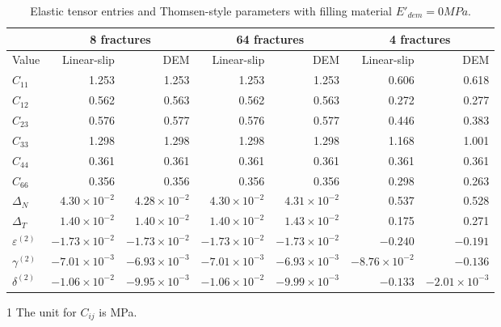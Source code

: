 \documentclass[review,authoryear]{elsarticle}
\begin{document}
\begin{table}
\centering
\begin{threeparttable}
\caption{Elastic tensor entries and Thomsen-style parameters with filling material $E'_{dem} = 0 MPa$.}
\begin{tabular}{lrr|rr|rr}
 \hline
& \multicolumn{2}{c|}{8 fractures}& \multicolumn{2}{c|}{64 fractures} & \multicolumn{2}{c}{4 fractures}\\
\hline
Value\tnote{1} & Linear-slip & DEM & Linear-slip & DEM & Linear-slip & DEM\\
\hline
$C_{11}$ 		& 1.253 & 1.253 & 1.253 & 1.253 & 0.606 & 0.618 \\
$C_{12}$ 		& 0.562 & 0.563 & 0.562 & 0.563 & 0.272 & 0.277 \\
$C_{23}$ 		& 0.576 & 0.577 & 0.576 & 0.577 & 0.446 & 0.383 \\
$C_{33}$ 		& 1.298 & 1.298 & 1.298 & 1.298 & 1.168 & 1.001 \\
$C_{44}$ 		& 0.361 & 0.361 & 0.361 & 0.361 & 0.361 & 0.361 \\
$C_{66}$ 		& 0.356 & 0.356 & 0.356 & 0.356 & 0.298 & 0.263 \\
$\Delta_N$  	& $4.30{\times}10^{-2}$ & $4.28{\times}10^{-2}$ & $4.30{\times}10^{-2}$ & $4.31{\times}10^{-2}$ & 0.537 & 0.528 \\
$\Delta_T$	& $1.40{\times}10^{-2}$ & $1.40{\times}10^{-2}$ & $ 1.40{\times}10^{-2}$ & $1.43{\times}10^{-2}$ & 0.175 & 0.271 \\
$\varepsilon^{(2)}$ & $-1.73{\times}10^{-2}$ & $-1.73{\times}10^{-2}$ & $-1.73{\times}10^{-2}$ & $-1.73{\times}10^{-2}$ & $-0.240$ & $-0.191$ \\
$\gamma^{(2)}$ 	  & $-7.01{\times}10^{-3}$ & $-6.93{\times}10^{-3}$ & $-7.01{\times}10^{-3}$ & $-6.93{\times}10^{-3}$ & $-8.76{\times}10^{-2}$ & $-0.136$ \\
$\delta^{(2)}$      & $-1.06{\times}10^{-2}$ & $-9.95{\times}10^{-3}$ & $-1.06{\times}10^{-2}$ & $-9.99{\times}10^{-3}$ & $-0.133$ & $-2.01{\times}10^{-3}$ \\
\hline    
\bottomrule
\end{tabular}\label{TABLE:DRY}
\begin{tablenotes}
      \item [1]  The unit for $C_{ij}$ is MPa.
\end{tablenotes}
\end{threeparttable}
\end{table}
\end{document}
